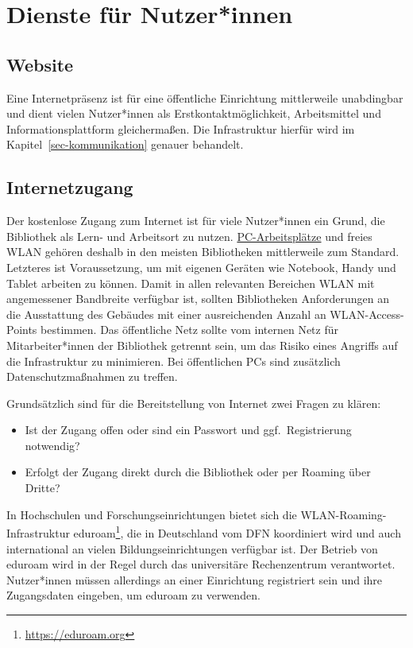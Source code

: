 \documentclass[
  11pt,
  letterpaper,
  DIV=11,
  twoside]{scrreprt}
\DeclareRobustCommand{\href}[2]{#2\footnote{\url{#1}}}
\begin{document}
\section{Dienste für Nutzer*innen}\label{dienste-fuxfcr-nutzerinnen}

\subsection{Website}\label{website}

Eine Internetpräsenz ist für eine öffentliche Einrichtung mittlerweile
unabdingbar und dient vielen Nutzer*innen als Erstkontaktmöglichkeit,
Arbeitsmittel und Informationsplattform gleichermaßen. Die Infrastruktur
hierfür wird im Kapitel~\ref{sec-kommunikation} genauer behandelt.

\subsection{Internetzugang}\label{internetzugang}

Der kostenlose Zugang zum Internet ist für viele Nutzer*innen ein Grund,
die Bibliothek als Lern- und Arbeitsort zu nutzen.
\hyperref[]{PC-Arbeitsplätze} und freies WLAN gehören deshalb in den
meisten Bibliotheken mittlerweile zum Standard. Letzteres ist
Voraussetzung, um mit eigenen Geräten wie Notebook, Handy und Tablet
arbeiten zu können. Damit in allen relevanten Bereichen WLAN mit
angemessener Bandbreite verfügbar ist, sollten Bibliotheken
Anforderungen an die Ausstattung des Gebäudes mit einer ausreichenden
Anzahl an WLAN-Access-Points bestimmen. Das öffentliche Netz sollte vom
internen Netz für Mitarbeiter*innen der Bibliothek getrennt sein, um das
Risiko eines Angriffs auf die Infrastruktur zu minimieren. Bei
öffentlichen PCs sind zusätzlich Datenschutzmaßnahmen zu treffen.

Grundsätzlich sind für die Bereitstellung von Internet zwei Fragen zu
klären:

\begin{itemize}
\item
  Ist der Zugang offen oder sind ein Passwort und ggf.~Registrierung
  notwendig?
\item
  Erfolgt der Zugang direkt durch die Bibliothek oder per Roaming über
  Dritte?
\end{itemize}

In Hochschulen und Forschungseinrichtungen bietet sich die
WLAN-Roaming-Infrastruktur \href{https://eduroam.org}{eduroam}, die in
Deutschland vom DFN koordiniert wird und auch international an vielen
Bildungseinrichtungen verfügbar ist. Der Betrieb von eduroam wird in der
Regel durch das universitäre Rechenzentrum verantwortet. Nutzer*innen
müssen allerdings an einer Einrichtung registriert sein und ihre
Zugangsdaten eingeben, um eduroam zu verwenden.
\end{document}
